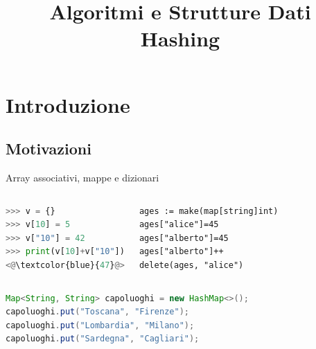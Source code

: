 
\title[ASD - Hashing]{\textbf{Algoritmi e Strutture Dati}\\[24pt]Hashing}

\usepackage{tikz}

\usepackage{listings}


\graphicspath{{figs/07/}}



\FrameTitle{}

\FrameContent

\section{Introduzione}

\subsection{Motivazioni}

\begin{frame}[fragile]{Array associativi, mappe e dizionari}

\vspace{-12pt}
\begin{columns}[T]
\begin{myboxtitle}[Python]
\vspace{-6pt}
\begin{lstlisting}[language=python]	
>>> v = {}
>>> v[10] = 5
>>> v["10"] = 42
>>> print(v[10]+v["10"])
<@\textcolor{blue}{47}@>
\end{lstlisting}
\end{myboxtitle}
\begin{myboxtitle}[Go]
\vspace{-6pt}
\begin{lstlisting}	
ages := make(map[string]int)
ages["alice"]=45
ages["alberto"]=45
ages["alberto"]++
delete(ages, "alice")
\end{lstlisting}
\end{myboxtitle}
\end{columns}
\begin{myboxtitle}[Java]
\vspace{-6pt}
\begin{lstlisting}[language=java]	
Map<String, String> capoluoghi = new HashMap<>();
capoluoghi.put("Toscana", "Firenze");
capoluoghi.put("Lombardia", "Milano");
capoluoghi.put("Sardegna", "Cagliari");
\end{lstlisting}
\end{myboxtitle}



\end{frame}




